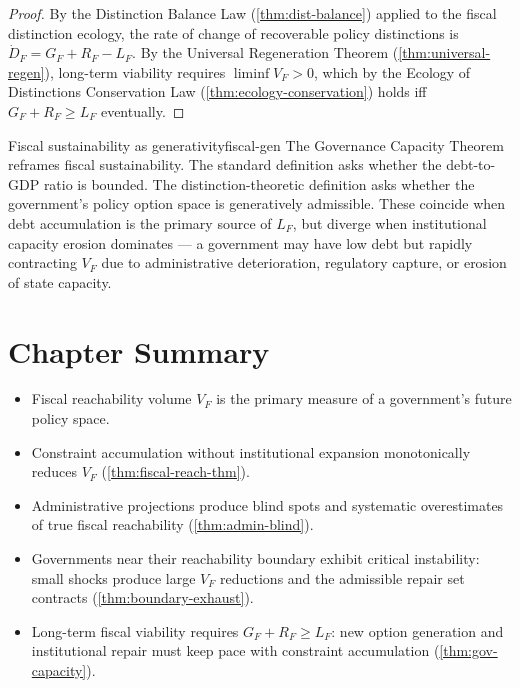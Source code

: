 \documentclass[12pt,twoside,openright]{book}
\newenvironment{chapsummary}{%
  \begin{tcolorbox}[colback=DistBlue!5,colframe=DistBlue,
    title={\faBookOpen\enspace Summary},
    fonttitle=\sffamily\bfseries\color{white},
    attach boxed title to top left={yshift=-2mm,xshift=4mm},
    boxed title style={colback=DistBlue,rounded corners}]
  \begin{itemize}[nosep,leftmargin=*]}{%
  \end{itemize}\end{tcolorbox}}
\begin{document}
\begin{proof}
  By the Distinction Balance Law
  (\cref{thm:dist-balance}) applied to the fiscal
  distinction ecology, the rate of change of
  recoverable policy distinctions is
  $\dot{D}_F = G_F + R_F - L_F$.
  By the Universal Regeneration Theorem
  (\cref{thm:universal-regen}), long-term viability
  requires $\liminf V_F > 0$, which by the Ecology
  of Distinctions Conservation Law
  (\cref{thm:ecology-conservation}) holds iff
  $G_F + R_F \ge L_F$ eventually.
\end{proof}

\begin{remark}{Fiscal sustainability as generativity}{fiscal-gen}
  The Governance Capacity Theorem reframes fiscal
  sustainability. The standard definition asks
  whether the debt-to-GDP ratio is bounded.
  The distinction-theoretic definition asks whether
  the government's policy option space is generatively
  admissible. These coincide when debt accumulation is
  the primary source of $L_F$, but diverge when
  institutional capacity erosion dominates — a
  government may have low debt but rapidly contracting
  $V_F$ due to administrative deterioration, regulatory
  capture, or erosion of state capacity.
\end{remark}

\section*{Chapter Summary}
\begin{chapsummary}
  \item Fiscal reachability volume $V_F$ is the primary
        measure of a government's future policy space.
  \item Constraint accumulation without institutional
        expansion monotonically reduces $V_F$
        (\cref{thm:fiscal-reach-thm}).
  \item Administrative projections produce blind spots
        and systematic overestimates of true fiscal
        reachability (\cref{thm:admin-blind}).
  \item Governments near their reachability boundary
        exhibit critical instability: small shocks
        produce large $V_F$ reductions and the
        admissible repair set contracts
        (\cref{thm:boundary-exhaust}).
  \item Long-term fiscal viability requires
        $G_F + R_F \ge L_F$: new option generation
        and institutional repair must keep pace with
        constraint accumulation
        (\cref{thm:gov-capacity}).
\end{chapsummary}
\end{document}
